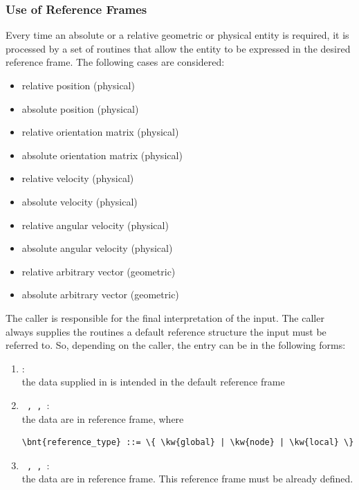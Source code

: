 \subsubsection{Use of Reference Frames}
Every time an absolute or a relative geometric or physical entity is
required, it is processed by a set of routines that allow the entity to be
expressed in the desired reference frame.
The following cases are considered:
\begin{itemize}
    \item relative position (physical)
    \item absolute position (physical)
    \item relative orientation matrix (physical)
    \item absolute orientation matrix (physical)
    \item relative velocity (physical)
    \item absolute velocity (physical)
    \item relative angular velocity (physical)
    \item absolute angular velocity (physical)
    \item relative arbitrary vector (geometric)
    \item absolute arbitrary vector (geometric)    
\end{itemize}
The caller is responsible for the final interpretation of the input. 
The caller always supplies the routines a default reference structure
the input must be referred to.
So, depending on the caller, the entry can be in the following forms:
\begin{enumerate}
\item {}: \\ 
	the data supplied in  is intended 
	in the default reference frame
\item \texttt{ ,  , }: \\
	the data are in  reference frame, where
\begin{Verbatim}[commandchars=\\\{\}]
        \bnt{reference_type} ::= \{ \kw{global} | \kw{node} | \kw{local} \}
\end{Verbatim}
\item \texttt{ ,  , }: \\
	the data are in  reference frame. 
	This reference frame must be already defined. 
\end{enumerate}
